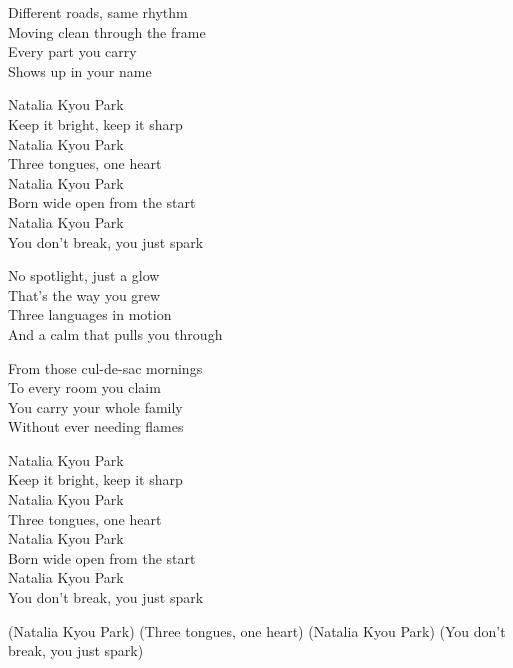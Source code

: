 \begin{lyrics}
Different roads, same rhythm\\
Moving clean through the frame\\
Every part you carry\\
Shows up in your name

Natalia Kyou Park\\
Keep it bright, keep it sharp\\
Natalia Kyou Park\\
Three tongues, one heart\\
Natalia Kyou Park\\
Born wide open from the start\\
Natalia Kyou Park\\
You don’t break, you just spark

No spotlight, just a glow\\
That’s the way you grew\\
Three languages in motion\\
And a calm that pulls you through

From those cul-de-sac mornings\\
To every room you claim\\
You carry your whole family\\
Without ever needing flames

Natalia Kyou Park\\
Keep it bright, keep it sharp\\
Natalia Kyou Park\\
Three tongues, one heart\\
Natalia Kyou Park\\
Born wide open from the start\\
Natalia Kyou Park\\
You don’t break, you just spark

(Natalia Kyou Park)
(Three tongues, one heart)
(Natalia Kyou Park)
(You don’t break, you just spark)
\end{lyrics}
